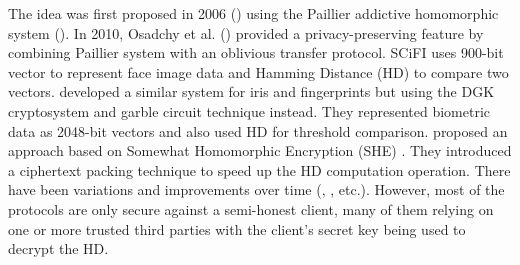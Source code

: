 The idea was first proposed in 2006 (\cite{schoenmakers2006efficient}) using the
Paillier addictive homomorphic system (\cite{paillier1999public}). In 2010,
Osadchy et al. (\cite{osadchy2010scifi}) provided a privacy-preserving feature
by combining Paillier system with an oblivious transfer protocol. SCiFI uses
900-bit vector to represent face image data and Hamming Distance (HD) to compare
two vectors. \cite{blanton2011secure} developed a similar system for iris and
fingerprints but using the DGK cryptosystem \cite{damgard2008homomorphic} and
garble circuit technique instead. They represented biometric data as 2048-bit
vectors and also used HD for threshold comparison. \cite{yasuda2014practical}
proposed an approach based on Somewhat Homomorphic Encryption (SHE)
\cite{brakerski2011fully}. They introduced a ciphertext packing technique to
speed up the HD computation operation. There have been variations and
improvements over time (\cite{shahandashti2012private},
\cite{mandal2015comprehensive}, etc.). However, most of the protocols are only
secure against a semi-honest client, many of them relying on one or more trusted
third parties with the client's secret key being used to decrypt the HD.

